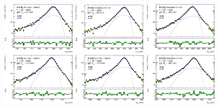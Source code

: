 \begin{figure}[htbp]
    \includegraphics[width=0.32\textwidth]{figures/HMHZZ/signal/NWA//ggf_mass_signal_800_H4l_2mu2e.eps}
    \includegraphics[width=0.32\textwidth]{figures/HMHZZ/signal/NWA//ggf_mass_signal_900_H4l_2mu2e.eps}
    \includegraphics[width=0.32\textwidth]{figures/HMHZZ/signal/NWA//ggf_mass_signal_1000_H4l_2mu2e.eps}\\
    \includegraphics[width=0.32\textwidth]{figures/HMHZZ/signal/NWA//ggf_mass_signal_1200_H4l_2mu2e.eps}
    \includegraphics[width=0.32\textwidth]{figures/HMHZZ/signal/NWA//ggf_mass_signal_1400_H4l_2mu2e.eps}
    \includegraphics[width=0.32\textwidth]{figures/HMHZZ/signal/NWA//ggf_mass_signal_1600_H4l_2mu2e.eps}\\

\end{figure}
